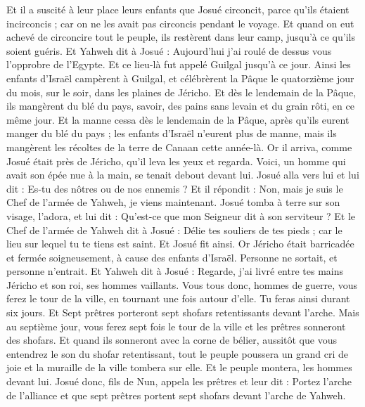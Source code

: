 \begin{multicols}{2}
Et il a suscité à leur place leurs enfants que Josué circoncit, parce qu'ils étaient incirconcis ; car on ne les avait pas circoncis pendant le voyage.
Et quand on eut achevé de circoncire tout le peuple, ils restèrent dans leur camp, jusqu'à ce qu'ils soient guéris.
Et Yahweh dit à Josué : Aujourd'hui j'ai roulé de dessus vous l'opprobre de l'Egypte. Et ce lieu-là fut appelé Guilgal jusqu'à ce jour.
Ainsi les enfants d'Israël campèrent à Guilgal, et célébrèrent la Pâque le quatorzième jour du mois, sur le soir, dans les plaines de Jéricho.
Et dès le lendemain de la Pâque, ils mangèrent du blé du pays, savoir, des pains sans levain et du grain rôti, en ce même jour.
Et la manne cessa dès le lendemain de la Pâque, après qu'ils eurent manger du blé du pays ; les enfants d'Israël n'eurent plus de manne, mais ils mangèrent les récoltes de la terre de Canaan cette année-là.
Or il arriva, comme Josué était près de Jéricho, qu'il leva les yeux et regarda. Voici, un homme qui avait son épée nue à la main, se tenait debout devant lui. Josué alla vers lui et lui dit : Es-tu des nôtres ou de nos ennemis ?
Et il répondit : Non, mais je suis le Chef de l'armée de Yahweh, je viens maintenant. Josué tomba à terre sur son visage, l'adora, et lui dit : Qu'est-ce que mon Seigneur dit à son serviteur ?
Et le Chef de l'armée de Yahweh dit à Josué : Délie tes souliers de tes pieds ; car le lieu sur lequel tu te tiens est saint. Et Josué fit ainsi.
\VerseOne{}Or Jéricho était barricadée et fermée soigneusement, à cause des enfants d'Israël. Personne ne sortait, et personne n'entrait.
Et Yahweh dit à Josué : Regarde, j'ai livré entre tes mains Jéricho et son roi, ses hommes vaillants.
Vous tous donc, hommes de guerre, vous ferez le tour de la ville, en tournant une fois autour d'elle. Tu feras ainsi durant six jours.
Et Sept prêtres porteront sept shofars retentissants devant l'arche. Mais au septième jour, vous ferez sept fois le tour de la ville et les prêtres sonneront des shofars.
Et quand ils sonneront avec la corne de bélier, aussitôt que vous entendrez le son du shofar retentissant, tout le peuple poussera un grand cri de joie et la muraille de la ville tombera sur elle. Et le peuple montera, les hommes devant lui.
Josué donc, fils de Nun, appela les prêtres et leur dit : Portez l'arche de l'alliance et que sept prêtres portent sept shofars devant l'arche de Yahweh.

\end{multicols}

